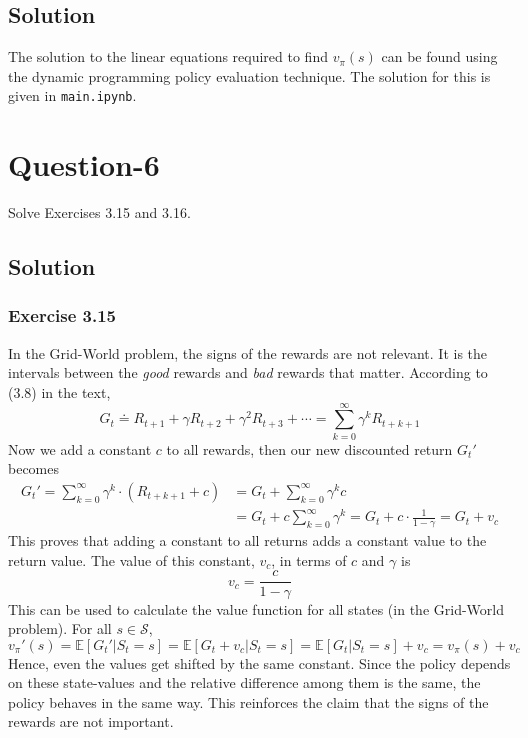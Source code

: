 \documentclass[11pt]{article}
\begin{document}
    \subsection*{Solution}
    The solution to the linear equations required to find $v_{\pi}(s)$ can be found using the dynamic
    programming policy evaluation technique. The solution for this is given in \texttt{main.ipynb}.

    \section*{Question-6}
    Solve Exercises 3.15 and 3.16.

    \subsection*{Solution}
    \subsubsection*{Exercise 3.15}
    In the Grid-World problem, the signs of the rewards are not relevant. It is the intervals between the
    \textit{good} rewards and \textit{bad} rewards that matter. According to (3.8) in the text,
    $$G_{t} \doteq R_{t+1} + \gamma R_{t+2} + \gamma^{2} R_{t+3} + \cdots = \sum_{k=0}^{\infty} \gamma^{k} R_{t+k+1}$$
    Now we add a constant $c$ to all rewards, then our new discounted return $G_{t}'$ becomes
    \begin{align*}
        G_{t}' = \sum_{k=0}^{\infty} \gamma^{k} \cdot ( R_{t+k+1} + c )
        &= G_{t} + \sum_{k=0}^{\infty} \gamma^{k} c \\
        &= G_{t} + c \sum_{k=0}^{\infty} \gamma^{k} = G_{t} + c \cdot \frac{1}{1 - \gamma} = G_{t} + v_{c}
    \end{align*}
    This proves that adding a constant to all returns adds a constant value to the return value. The
    value of this constant, $v_{c}$, in terms of $c$ and $\gamma$ is
    $$v_{c} = \frac{c}{1 - \gamma}$$
    This can be used to calculate the value function for all states (in the Grid-World problem).
    For all $s \in \mathcal{S}$,
    $$v_{\pi}'(s) = \mathbb{E}[G_{t}' | S_{t} = s] = \mathbb{E}[G_{t} + v_{c} | S_{t} = s]
    = \mathbb{E}[G_{t} | S_{t} = s] + v_{c} = v_{\pi}(s) + v_{c}$$
    Hence, even the values get shifted by the same constant. Since the policy depends on these state-values
    and the relative difference among them is the same, the policy behaves in the same way. This reinforces
    the claim that the signs of the rewards are not important.
\end{document}
